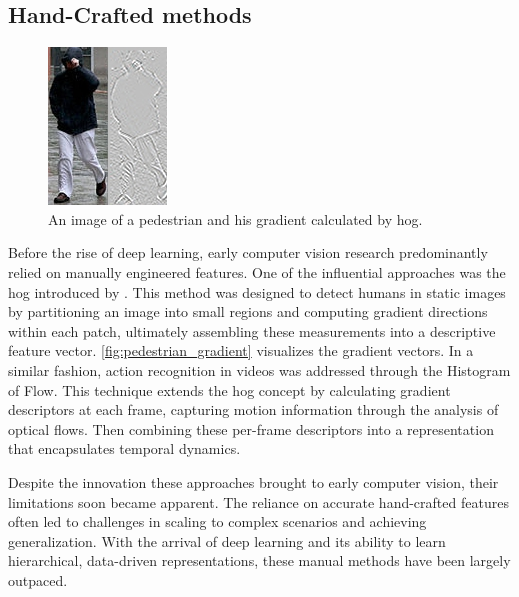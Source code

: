 \subsection{Hand-Crafted methods}

\begin{figure}
    \centering
    \includegraphics[width=0.5\linewidth]{figures/Pedestrian_gradient.jpg}
    \caption{An image of a pedestrian and his gradient calculated by \acrshort{hog}.}
    \label{fig:pedestrian_gradient}
\end{figure}

Before the rise of deep learning, early computer vision research predominantly relied on manually engineered features. One of the influential approaches was the \acrfull{hog} introduced by \textcite{dalal_histogram_of_gradients}. This method was designed to detect humans in static images by partitioning an image into small regions and computing gradient directions within each patch, ultimately assembling these measurements into a descriptive feature vector. \autoref{fig:pedestrian_gradient} visualizes the gradient vectors. In a similar fashion, action recognition in videos was addressed through the Histogram of Flow\cite{dalal_histogram_of_flow}. This technique extends the \acrshort{hog} concept by calculating gradient descriptors at each frame, capturing motion information through the analysis of optical flows. Then combining these per-frame descriptors into a representation that encapsulates temporal dynamics. 

Despite the innovation these approaches brought to early computer vision, their limitations soon became apparent. The reliance on accurate hand-crafted features often led to challenges in scaling to complex scenarios and achieving generalization. With the arrival of deep learning and its ability to learn hierarchical, data-driven representations, these manual methods have been largely outpaced. 


